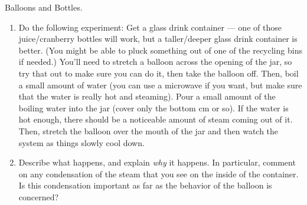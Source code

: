 \begin{aproblem}{Balloons and Bottles.}
  \begin{enumerate}

  \item Do the following experiment: Get a glass drink container ---
    one of those juice/cranberry bottles will work, but a
    taller/deeper glass drink container is better.  (You might be able
    to pluck something out of one of the recycling bins if needed.)
    You'll need to stretch a balloon across the opening of the jar, so
    try that out to make sure you can do it, then take the balloon
    off.  Then, boil a small amount of water (you can use a microwave
    if you want, but make sure that the water is really hot and
    steaming).  Pour a small amount of the boiling water into the jar
    (cover only the bottom cm or so).  If the water is hot enough,
    there should be a noticeable amount of steam coming out of it.
    Then, stretch the balloon over the mouth of the jar and then watch
    the system as things slowly cool down.

  \item Describe what happens, and explain {\em why} it happens.  In
    particular, comment on any condensation of the steam that you see
    on the inside of the container.  Is this condensation important as
    far as the behavior of the balloon is concerned?

  \end{enumerate}
\end{aproblem}


